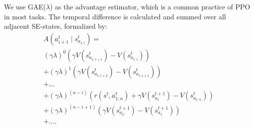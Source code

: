 \documentclass[letterpaper]{article} \usepackage{aaai23}  \usepackage{times}  \usepackage{helvet}  \usepackage{courier}  \usepackage[hyphens]{url}  \usepackage{graphicx} \urlstyle{rm} \def\UrlFont{\rm}  \usepackage{natbib}  \usepackage{caption} \frenchspacing  \setlength{\pdfpagewidth}{8.5in} \setlength{\pdfpageheight}{11in} \usepackage{algorithm}
\begin{document}
We use GAE($\lambda$) as the advantage estimator, which is a common practice of PPO in most tasks. The temporal difference is calculated and summed over all adjacent SE-states, formalized by:
\begin{gather}
\label{ppo_gae}
   A\left(a_{i+1}^t \mid s_{a_{1:i}}^t\right) = \\ 
   (\gamma\lambda)^0 \left(\gamma V\left(s_{a_{1:i+1}}^t\right) - V\left(s_{a_{1:i}}^t\right)\right) \\
   +(\gamma\lambda)^1 \left(\gamma V\left(s_{a_{1:i+2}}^t\right) - V\left(s_{a_{1:i+1}}^t\right)\right) \\
   +\ldots\\
   +(\gamma\lambda)^{(n-i)} \left(r\left(s^{t}, a_{1:n}^t\right)+\gamma V\left(s_{a_{1}}^{t+1}\right) - V\left(s_{a_{1:n}}^t\right)\right) \\
   +(\gamma\lambda)^{(n-i+1)} \left(\gamma V\left(s_{a_{2}}^{t+1}\right) - V\left(s_{a_{1}}^{t+1}\right)\right) \\
   +\ldots.
\end{gather}
\end{document}
